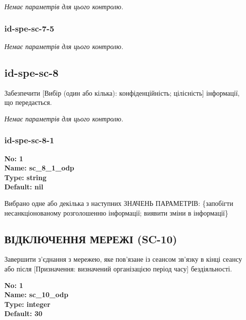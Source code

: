 \documentclass{article}
\begin{document}
\vspace{10pt}
\textit{Немає параметрів для цього контролю.}
\vspace{10pt}


\subsubsection{id-spe-sc-7-5}


\vspace{10pt}
\textit{Немає параметрів для цього контролю.}
\vspace{10pt}


\subsection{id-spe-sc-8}
Забезпечити [Вибір (один або кілька): конфіденційність; цілісність] інформації, що передається.

\vspace{10pt}
\textit{Немає параметрів для цього контролю.}
\vspace{10pt}


\subsubsection{id-spe-sc-8-1}


\vspace{10pt}
{\footnotesize\bfseries
No: 1\\
Name: sc\_\allowbreak{}8\_\allowbreak{}1\_\allowbreak{}odp\\
Type: string\\
Default: nil
}

{\footnotesize Вибрано одне або декілька з наступних ЗНАЧЕНЬ ПАРАМЕТРІВ: \{запобігти несанкціонованому розголошенню інформації; виявити зміни в інформації\}}




\subsection{ВІДКЛЮЧЕННЯ МЕРЕЖІ (SC-10)}
Завершити з'єднання з мережею, яке пов'язане із сеансом зв'язку в кінці сеансу або після [Призначення: визначений організацією період часу] бездіяльності.

\vspace{10pt}
{\footnotesize\bfseries
No: 1\\
Name: sc\_\allowbreak{}10\_\allowbreak{}odp\\
Type: integer\\
Default: 30
}
\end{document}
